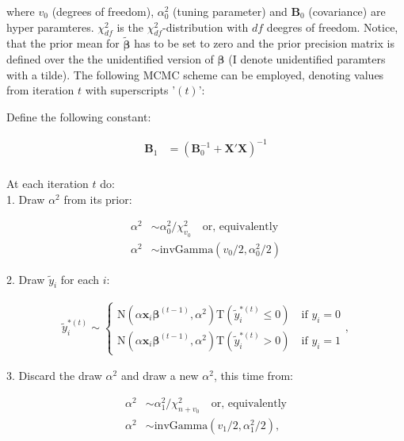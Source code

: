 \documentclass[11pt,a4paper]{article}
\begin{document}
where $v_0$ (degrees of freedom), $\alpha_0^2$ (tuning parameter) and $\mathbf{B}_0$ (covariance) are hyper paramteres. $\chi_{df}^2$ is the $\chi_{df}^2$-distribution with $df$ deegres of freedom. Notice, that the prior mean for $\bm{\tilde{\beta}}$ has to be set to zero and the prior precision matrix is defined over the the unidentified version of $\bm{\beta}$ (I denote unidentified paramters with a tilde).  The following MCMC scheme can be employed, denoting values from iteration $t$ with superscripts '$(t)$': 

\begin{shadedbox}
Define the following constant: 

\begin{equation*}
\begin{split}
\mathbf{B}_1 &= (\mathbf{B}^{-1}_0 + \mathbf{X}'\mathbf{X})^{-1} \\
\end{split}
\end{equation*}

At each iteration $t$ do:  \\
1. Draw $\alpha^2$ from its prior: 

\begin{equation*}
\begin{split}
\alpha^2 &\sim \alpha_0^2/\chi_{v_0}^2 \quad \text{or, equivalently} \\
\alpha^2 &\sim \mathrm{invGamma}(v_0/2,\alpha_0^2/2)
\end{split}
\end{equation*}

2. Draw $\tilde{y}_i$ for each $i$: 

\begin{equation*}
\begin{split}
	 \tilde{y}_i^{*(t)} \sim \left \{
	  \begin{array}{ll}
	    	\mathrm{N}(\alpha \mathbf{x}_i \boldsymbol{\beta}^{(t-1)},\alpha^2)\mathrm{T}(\tilde{y}_i^{*(t)} \leq 0) \quad \text{if \ } y_i = 0 \\
	    	\mathrm{N}(\alpha \mathbf{x}_i \boldsymbol{\beta}^{(t-1)},\alpha^2)\mathrm{T}(\tilde{y}_i^{*(t)} > 0) \quad \text{if \ } y_i = 1
	  \end{array} \right.,
\end{split}	
\end{equation*}

3. Discard the draw $\alpha^2$ and draw a new $\alpha^2$, this time from: 

\begin{equation*}
\begin{split}
\alpha^2 &\sim \alpha_1^2 / \chi_{n+v_0}^2  \quad \text{or, equivalently} \\
\alpha^2 &\sim \mathrm{invGamma}(v_1/2,\alpha_1^2/2), 
\end{split}	
\end{equation*}


\end{shadedbox}
\end{document}
